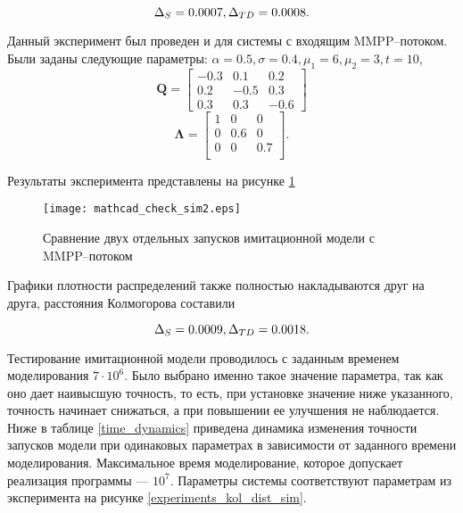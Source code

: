 \begin{equation*}
	\Delta_S = 0.0007,\\
	\Delta_{TD} = 0.0008.
\end{equation*}

Данный эксперимент был проведен и для системы с входящим MMPP--потоком. Были заданы следующие параметры: $\alpha = 0.5, \sigma = 0.4, \mu_{1} = 6, \mu_{2} = 3, t = 10 $,
\begin{equation*}
	\boldsymbol{Q}=\begin{bmatrix}
		-0.3 &  0.1 &  0.2\\
		0.2 & -0.5 &  0.3\\
		0.3 &  0.3 &  -0.6
	\end{bmatrix}
\end{equation*}
\begin{equation*}
	\boldsymbol{\Lambda}=\begin{bmatrix}
		1 &	0 & 0\\
		0 &	0.6 & 0\\
		0 &	0 & 0.7\\
	\end{bmatrix}.
\end{equation*}

Результаты эксперимента представлены на рисунке \ref{experiments_kol_dist_sim2}

\begin{figure}[H]
	\centering
	\texttt{[image: mathcad\_check\_sim2.eps]}
	\caption{Сравнение двух отдельных запусков имитационной модели с MMPP--потоком}
	\label{experiments_kol_dist_sim2}
\end{figure} 

Графики плотности распределений также полностью накладываются друг на друга, расстояния Колмогорова составили

\begin{equation*}
	\Delta_S = 0.0009,\\
	\Delta_{TD} = 0.0018.
\end{equation*}

Тестирование имитационной модели проводилось с заданным временем моделирования $7\cdot 10^6$. Было выбрано именно такое значение параметра, так как оно дает наивысшую точность, то есть, при установке значение ниже указанного, точность начинает снижаться, а при повышении ее улучшения не наблюдается. Ниже в таблице \ref{time_dynamics} приведена динамика изменения точности запусков модели при одинаковых параметрах в зависимости от заданного времени моделирования. Максимальное время моделирование, которое допускает реализация программы --- $10^7$. Параметры системы соответствуют параметрам из эксперимента на рисунке \ref{experiments_kol_dist_sim}.

